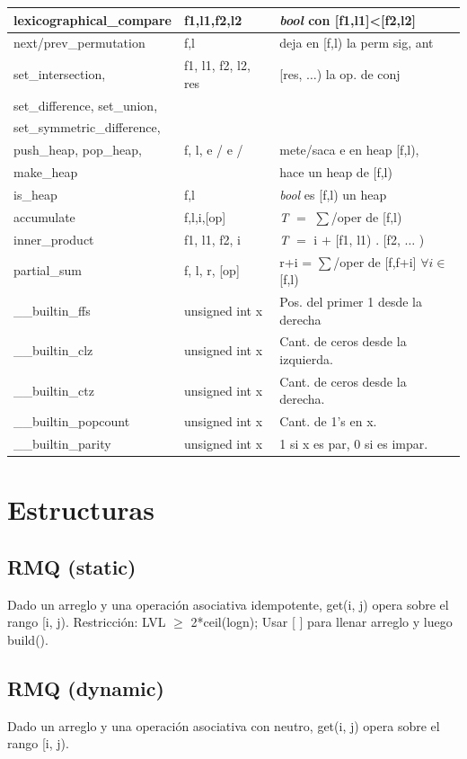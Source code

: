 \documentclass[10pt,landscape,twocolumn,a4paper,notitlepage]{article}
\newcommand\cppfile[2][]{

}
\begin{document}
\begin{tabular}{|l|l|p{5.4cm}|}
lexicographical\_compare & f1,l1,f2,l2 & \textit{bool} con [f1,l1]<[f2,l2]\\\hline
next/prev\_permutation & f,l & deja en [f,l) la perm sig, ant\\\hline
set\_intersection, & f1, l1, f2, l2, res & [res, $\ldots$) la op. de conj\\
set\_difference, set\_union, & & \\
set\_symmetric\_difference, & &\\\hline
push\_heap, pop\_heap, & f, l, e / e / & mete/saca e en heap [f,l), \\
make\_heap & & hace un heap de [f,l)\\\hline
is\_heap & f,l & \textit{bool} es [f,l) un heap\\\hline
accumulate & f,l,i,[op] & \textit{T} $=$ $\sum$/oper de [f,l)\\\hline
inner\_product & f1, l1, f2, i & \textit{T} $=$ i $+$ [f1, l1) . [f2, $\ldots$ )\\\hline
partial\_sum & f, l, r, [op] & r+i = $\sum$/oper de [f,f+i] $\forall i \in$[f,l)\\\hline
\_\_builtin\_ffs& unsigned int x & Pos. del primer 1 desde la derecha\\\hline
\_\_builtin\_clz & unsigned int x & Cant. de ceros desde la izquierda.\\\hline
\_\_builtin\_ctz & unsigned int x & Cant. de ceros desde la derecha.\\\hline
\_\_builtin\_popcount & unsigned int x & Cant. de 1’s en x.\\\hline
\_\_builtin\_parity & unsigned int x & 1 si x es par, 0 si es impar.\\\hline
\end{tabular}


\section{Estructuras}
\subsection{RMQ (static)}
Dado un arreglo y una operación asociativa idempotente, get(i, j) opera sobre el rango [i, j). Restricción: LVL $\ge$ 2*ceil(logn); Usar [ ] para llenar arreglo y luego build().
\cppfile{estructuras/rmq.static}
\subsection{RMQ (dynamic)}
Dado un arreglo y una operación asociativa con neutro, get(i, j) opera sobre el rango [i, j).
\cppfile{estructuras/rmq.dynamic}
\end{document}
